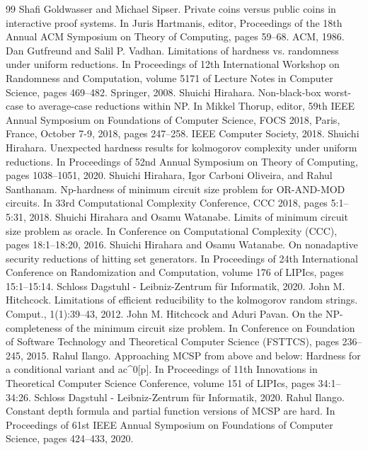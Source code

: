 \begin{thebibliography}{99}
 Shafi Goldwasser and Michael Sipser. Private coins versus public coins in interactive proof systems. In Juris Hartmanis, editor, Proceedings of the 18th Annual ACM Symposium on Theory of Computing, pages 59–68. ACM, 1986.
 Dan Gutfreund and Salil P. Vadhan. Limitations of hardness vs. randomness under uniform reductions. In Proceedings of 12th International Workshop on Randomness and Computation, volume 5171 of Lecture Notes in Computer Science, pages 469–482. Springer, 2008.
 Shuichi Hirahara. Non-black-box worst-case to average-case reductions within NP. In Mikkel Thorup, editor, 59th IEEE Annual Symposium on Foundations of Computer Science, FOCS 2018, Paris, France, October 7-9, 2018, pages 247–258. IEEE Computer Society, 2018.
 Shuichi Hirahara. Unexpected hardness results for kolmogorov complexity under uniform reductions. In Proceedings of 52nd Annual Symposium on Theory of Computing, pages 1038–1051, 2020.
 Shuichi Hirahara, Igor Carboni Oliveira, and Rahul Santhanam. Np-hardness of minimum circuit size problem for OR-AND-MOD circuits. In 33rd Computational Complexity Conference, CCC 2018, pages 5:1–5:31, 2018.
 Shuichi Hirahara and Osamu Watanabe. Limits of minimum circuit size problem as oracle. In Conference on Computational Complexity (CCC), pages 18:1–18:20, 2016.
 Shuichi Hirahara and Osamu Watanabe. On nonadaptive security reductions of hitting set generators. In Proceedings of 24th International Conference on Randomization and Computation, volume 176 of LIPIcs, pages 15:1–15:14. Schloss Dagstuhl - Leibniz-Zentrum für Informatik, 2020.
 John M. Hitchcock. Limitations of efficient reducibility to the kolmogorov random strings. Comput., 1(1):39–43, 2012.
 John M. Hitchcock and Aduri Pavan. On the NP-completeness of the minimum circuit size problem. In Conference on Foundation of Software Technology and Theoretical Computer Science (FSTTCS), pages 236–245, 2015.
 Rahul Ilango. Approaching MCSP from above and below: Hardness for a conditional variant and ac\textasciicircum{}0[p]. In Proceedings of 11th Innovations in Theoretical Computer Science Conference, volume 151 of LIPIcs, pages 34:1–34:26. Schloss Dagstuhl - Leibniz-Zentrum für Informatik, 2020.
 Rahul Ilango. Constant depth formula and partial function versions of MCSP are hard. In Proceedings of 61st IEEE Annual Symposium on Foundations of Computer Science, pages 424–433, 2020.

\end{thebibliography}
